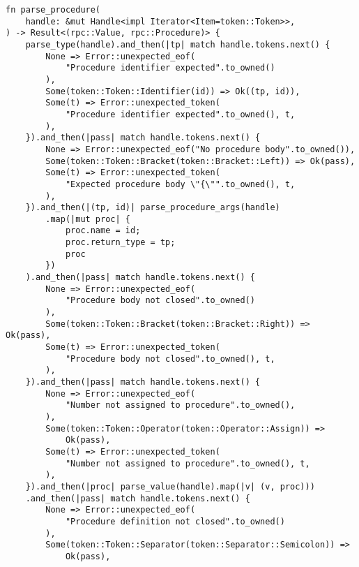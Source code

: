 \begin{lstlisting}[caption={Разбор процедуры (часть 1)}, label={lst:rust_parser_procedure1}]
fn parse_procedure(
    handle: &mut Handle<impl Iterator<Item=token::Token>>,
) -> Result<(rpc::Value, rpc::Procedure)> {
    parse_type(handle).and_then(|tp| match handle.tokens.next() {
        None => Error::unexpected_eof(
            "Procedure identifier expected".to_owned()
        ),
        Some(token::Token::Identifier(id)) => Ok((tp, id)),
        Some(t) => Error::unexpected_token(
            "Procedure identifier expected".to_owned(), t,
        ),
    }).and_then(|pass| match handle.tokens.next() {
        None => Error::unexpected_eof("No procedure body".to_owned()),
        Some(token::Token::Bracket(token::Bracket::Left)) => Ok(pass),
        Some(t) => Error::unexpected_token(
            "Expected procedure body \"{\"".to_owned(), t,
        ),
    }).and_then(|(tp, id)| parse_procedure_args(handle)
        .map(|mut proc| {
            proc.name = id;
            proc.return_type = tp;
            proc
        })
    ).and_then(|pass| match handle.tokens.next() {
        None => Error::unexpected_eof(
            "Procedure body not closed".to_owned()
        ),
        Some(token::Token::Bracket(token::Bracket::Right)) => Ok(pass),
        Some(t) => Error::unexpected_token(
            "Procedure body not closed".to_owned(), t,
        ),
    }).and_then(|pass| match handle.tokens.next() {
        None => Error::unexpected_eof(
            "Number not assigned to procedure".to_owned(),
        ),
        Some(token::Token::Operator(token::Operator::Assign)) =>
            Ok(pass),
        Some(t) => Error::unexpected_token(
            "Number not assigned to procedure".to_owned(), t,
        ),
    }).and_then(|proc| parse_value(handle).map(|v| (v, proc)))
    .and_then(|pass| match handle.tokens.next() {
        None => Error::unexpected_eof(
            "Procedure definition not closed".to_owned()
        ),
        Some(token::Token::Separator(token::Separator::Semicolon)) =>
            Ok(pass),
\end{lstlisting}
\clearpage

